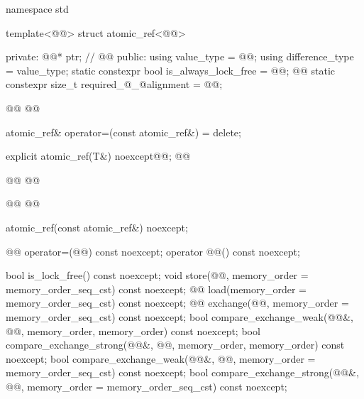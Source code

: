 \begin{codeblock}
namespace std {
  template<@@> struct atomic_ref<@@> {
  private:
    @@* ptr;        // \expos
    @@
  public:
    using value_type = @@;
    using difference_type = value_type;
    static constexpr bool is_always_lock_free = @@;
    @@
    static constexpr size_t required_@_@alignment = @@;

    @@
    @@

    atomic_ref& operator=(const atomic_ref&) = delete;

    explicit atomic_ref(T&) noexcept@@;
    @@
    
    @@
    @@
    
    @@
    @@

    atomic_ref(const atomic_ref&) noexcept;

    @@ operator=(@@) const noexcept;
    operator @@() const noexcept;

    bool is_lock_free() const noexcept;
    void store(@@, memory_order = memory_order_seq_cst) const noexcept;
    @@ load(memory_order = memory_order_seq_cst) const noexcept;
    @@ exchange(@@,
                      memory_order = memory_order_seq_cst) const noexcept;
    bool compare_exchange_weak(@@&, @@,
                               memory_order, memory_order) const noexcept;
    bool compare_exchange_strong(@@&, @@,
                                 memory_order, memory_order) const noexcept;
    bool compare_exchange_weak(@@&, @@,
                               memory_order = memory_order_seq_cst) const noexcept;
    bool compare_exchange_strong(@@&, @@,
                                 memory_order = memory_order_seq_cst) const noexcept;

}}
\end{codeblock}
